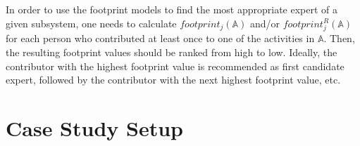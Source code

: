In order to use the footprint models to find the most appropriate expert of a given subsystem, one needs to calculate $footprint_j(\mathbb{A})$ and/or $footprint_j^R(\mathbb{A})$ for each person who contributed at least once to one of the activities in $\mathbb{A}$. Then, the resulting footprint values should be ranked from high to low. Ideally, the contributor with the highest footprint value is recommended as first candidate expert, followed by the contributor with the next highest footprint value, etc.%











\section{Case Study Setup}
\label{sec:case-study-setup}

